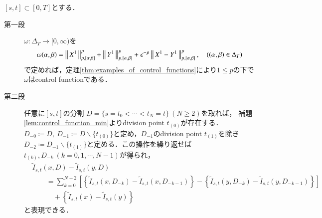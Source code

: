 	\begin{prf}
		$[s,t] \subset [0,T]$とする．
		\begin{description}
			\item[第一段]
				$\omega:\Delta_T \longrightarrow [0,\infty)$を
				\begin{align}
					\omega(\alpha,\beta) = \left\|\, X^1\, \right\|_{p,[\alpha,\beta]}^p + \left\|\, Y^1\, \right\|_{p,[\alpha,\beta]}^p + \epsilon^{-p} \left\|\, X^1 - Y^1\, \right\|_{p,[\alpha,\beta]}^p,
					\quad ((\alpha,\beta) \in \Delta_T)
				\end{align}
				で定めれば，定理\ref{thm:examples_of_control_functions}により$1 \leq p$の下で$\omega$はcontrol functionである．
				
			\item[第二段]
				任意に$[s,t]$の分割
				$D = \{s=t_0 < \cdots < t_N=t\}\ (N \geq 2)$を取れば，
				補題\ref{lem:control_function_min}よりdivision point $t_{(0)}$が存在する．
				$D_{-0} \coloneqq D,\ D_{-1} \coloneqq D \backslash \{t_{(0)}\}$と定め，$D_{-1}$のdivision point $t_{(1)}$を除き
				$D_{-2} \coloneqq D_{-1} \backslash \{t_{(1)}\}$と定める．この操作を繰り返せば
				$t_{(k)},D_{-k}\ (k=0,1,\cdots,N-1)$が得られ，
				\begin{align}
					&\tilde{I}_{s,t}(x,D) - \tilde{I}_{s,t}(y,D) \\
					&\qquad = \sum_{k=0}^{N-2} \left[ \left\{ \tilde{I}_{s,t}(x,D_{-k}) - \tilde{I}_{s,t}(x,D_{-k-1}) \right\} - 
						\left\{ \tilde{I}_{s,t}(y,D_{-k}) - \tilde{I}_{s,t}(y,D_{-k-1}) \right\} \right] \label{eq:continuity_theorem_1_1}\\
					&\quad \qquad + \left\{ \tilde{I}_{s,t}(x) - \tilde{I}_{s,t}(y) \right\}	\label{eq:continuity_theorem_1_2}
				\end{align}
				と表現できる．
			

\end{description}
\end{prf}
